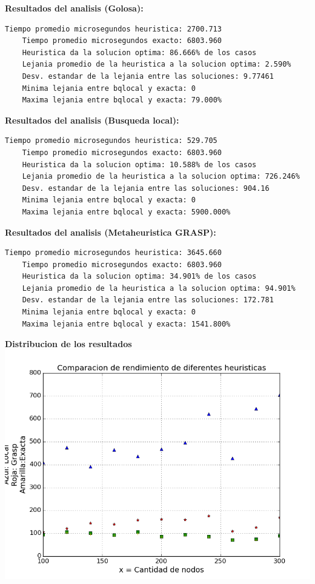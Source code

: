 \vspace{1cm}

\textbf{Resultados del analisis (Golosa):}
\begin{lstlisting}[frame=single]	
	Tiempo promedio microsegundos heuristica: 2700.713
	Tiempo promedio microsegundos exacto: 6803.960
	Heuristica da la solucion optima: 86.666% de los casos
	Lejania promedio de la heuristica a la solucion optima: 2.590%
	Desv. estandar de la lejania entre las soluciones: 9.77461
	Minima lejania entre bqlocal y exacta: 0
	Maxima lejania entre bqlocal y exacta: 79.000%
\end{lstlisting}

\textbf{Resultados del analisis (Busqueda local):}
\begin{lstlisting}[frame=single]	
	Tiempo promedio microsegundos heuristica: 529.705
	Tiempo promedio microsegundos exacto: 6803.960
	Heuristica da la solucion optima: 10.588% de los casos
	Lejania promedio de la heuristica a la solucion optima: 726.246%
	Desv. estandar de la lejania entre las soluciones: 904.16
	Minima lejania entre bqlocal y exacta: 0
	Maxima lejania entre bqlocal y exacta: 5900.000%
\end{lstlisting}

\textbf{Resultados del analisis (Metaheuristica GRASP):}
\begin{lstlisting}[frame=single]	
	Tiempo promedio microsegundos heuristica: 3645.660
	Tiempo promedio microsegundos exacto: 6803.960
	Heuristica da la solucion optima: 34.901% de los casos
	Lejania promedio de la heuristica a la solucion optima: 94.901%
	Desv. estandar de la lejania entre las soluciones: 172.781
	Minima lejania entre bqlocal y exacta: 0
	Maxima lejania entre bqlocal y exacta: 1541.800%
\end{lstlisting}

\vspace{2cm}

\begin{center}	
	\textbf{Distribucion de los resultados}\\
	\includegraphics[scale=0.7]{experimentos/performance-optimalidad-intermedios/comparacion_optimalidad.png}
\end{center}

